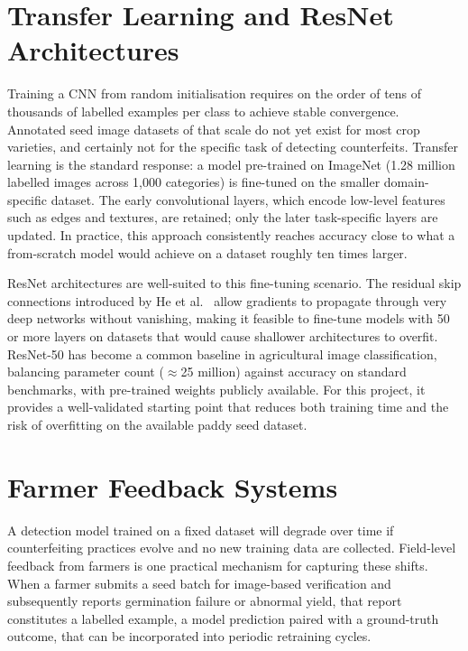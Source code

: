 \section{Transfer Learning and ResNet Architectures}

Training a CNN from random initialisation requires on the order of tens of thousands of labelled examples per class to achieve stable convergence. Annotated seed image datasets of that scale do not yet exist for most crop varieties, and certainly not for the specific task of detecting counterfeits. Transfer learning is the standard response: a model pre-trained on ImageNet (1.28 million labelled images across 1{,}000 categories) is fine-tuned on the smaller domain-specific dataset. The early convolutional layers, which encode low-level features such as edges and textures, are retained; only the later task-specific layers are updated. In practice, this approach consistently reaches accuracy close to what a from-scratch model would achieve on a dataset roughly ten times larger.

ResNet architectures are well-suited to this fine-tuning scenario. The residual skip connections introduced by He et al.~\cite{he2016deep} allow gradients to propagate through very deep networks without vanishing, making it feasible to fine-tune models with 50 or more layers on datasets that would cause shallower architectures to overfit. ResNet-50 has become a common baseline in agricultural image classification, balancing parameter count ($\approx$25 million) against accuracy on standard benchmarks, with pre-trained weights publicly available. For this project, it provides a well-validated starting point that reduces both training time and the risk of overfitting on the available paddy seed dataset.

\section{Farmer Feedback Systems}

A detection model trained on a fixed dataset will degrade over time if counterfeiting practices evolve and no new training data are collected. Field-level feedback from farmers is one practical mechanism for capturing these shifts. When a farmer submits a seed batch for image-based verification and subsequently reports germination failure or abnormal yield, that report constitutes a labelled example, a model prediction paired with a ground-truth outcome, that can be incorporated into periodic retraining cycles.

